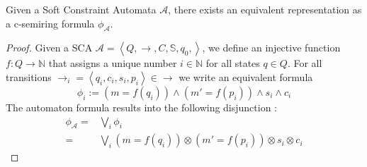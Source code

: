 \begin{theorem}
	Given a Soft Constraint Automata $\mathcal{A}$, there exists an equivalent representation as a c-semiring formula $\phi_{\mathcal{A}}$.
\end{theorem}
\begin{proof}
	Given a SCA $\mathcal{A} = \left\langle Q, \rightarrow, C, \mathbb{S}, q_{0}, \right\rangle$, we define an injective function $f : Q \rightarrow \mathbb{N}$ that assigns a unique number $i \in \mathbb{N}$ for all states $q \in Q$. For all transitions $\rightarrow_i = \left\langle q_i, c_i, s_i, p_i \right\rangle \in \rightarrow $ we write an equivalent formula $$\phi_i := (m = f(q_i)) \land (m'= f(p_i)) \land s_i \land c_i$$
	The automaton formula results into the following disjunction :
	\begin{align*}
	\phi_{\mathcal{A}} 	= 	& 	\bigvee_i \phi_i \\
						=	&	\bigvee_i (m = f(q_i)) \otimes (m'= f(p_i)) \otimes s_i \otimes c_i 
	\end{align*}
\end{proof}